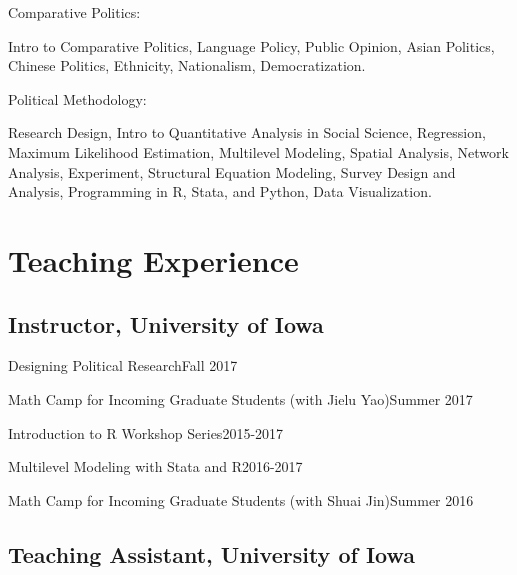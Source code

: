 \documentclass[10.5pt,]{article}
\providecommand{\tightlist}{%
	\setlength{\itemsep}{0pt}\setlength{\parskip}{0pt}}
\renewenvironment{itemize}{
	\begin{list}{}{
			\setlength{\leftmargin}{1.5em}
		}
	}{
	\end{list}
}
\begin{document}
\begin{itemize}
\tightlist
\item
  Comparative Politics:

  \begin{itemize}
  \tightlist
  \item
    Intro to Comparative Politics, Language Policy, Public Opinion,
    Asian Politics, Chinese Politics, Ethnicity, Nationalism,
    Democratization.
  \end{itemize}
\item
  Political Methodology:

  \begin{itemize}
  \tightlist
  \item
    Research Design, Intro to Quantitative Analysis in Social Science,
    Regression, Maximum Likelihood Estimation, Multilevel Modeling,
    Spatial Analysis, Network Analysis, Experiment, Structural Equation
    Modeling, Survey Design and Analysis, Programming in R, Stata, and
    Python, Data Visualization.
  \end{itemize}
\end{itemize}

\section{Teaching Experience}\label{teaching-experience}

\subsection{Instructor, University of
Iowa}\label{instructor-university-of-iowa}

\begin{itemize}
\tightlist
\item
  Designing Political Research\hfill Fall 2017
\item
  Math Camp for Incoming Graduate Students (with Jielu Yao)\hfill Summer
  2017
\item
  Introduction to R Workshop Series\hfill 2015-2017
\item
  Multilevel Modeling with Stata and R\hfill 2016-2017
\item
  Math Camp for Incoming Graduate Students (with Shuai Jin)\hfill Summer
  2016
\end{itemize}

\subsection{Teaching Assistant, University of
Iowa}\label{teaching-assistant-university-of-iowa}
\end{document}
